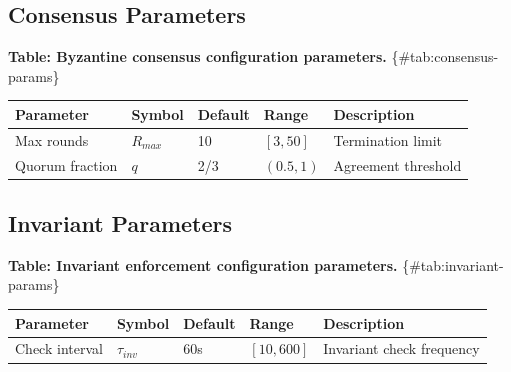 \documentclass[
]{article}
\newcounter{none} %
\begin{document}
\subsection{Consensus Parameters}\label{sec:consensus-params}

\textbf{Table: Byzantine consensus configuration parameters.}
\{\#tab:consensus-params\}

{\def\LTcaptype{none} %
\begin{longtable}[]{@{}lllll@{}}
\toprule\noalign{}
Parameter & Symbol & Default & Range & Description \\
\midrule\noalign{}
\endhead
\bottomrule\noalign{}
\endlastfoot
Max rounds & \(R_{max}\) & 10 & \([3, 50]\) & Termination limit \\
Quorum fraction & \(q\) & 2/3 & \((0.5, 1)\) & Agreement threshold \\
\end{longtable}
}

\subsection{Invariant Parameters}\label{sec:invariant-params}

\textbf{Table: Invariant enforcement configuration parameters.}
\{\#tab:invariant-params\}

{\def\LTcaptype{none} %
\begin{longtable}[]{@{}
  >{\raggedright\arraybackslash}p{}
  >{\raggedright\arraybackslash}p{}
  >{\raggedright\arraybackslash}p{}
  >{\raggedright\arraybackslash}p{}
  >{\raggedright\arraybackslash}p{}@{}}
\toprule\noalign{}
\begin{minipage}[b]{\linewidth}\raggedright
Parameter
\end{minipage} & \begin{minipage}[b]{\linewidth}\raggedright
Symbol
\end{minipage} & \begin{minipage}[b]{\linewidth}\raggedright
Default
\end{minipage} & \begin{minipage}[b]{\linewidth}\raggedright
Range
\end{minipage} & \begin{minipage}[b]{\linewidth}\raggedright
Description
\end{minipage} \\
\midrule\noalign{}
\endhead
\bottomrule\noalign{}
\endlastfoot
Check interval & \(\tau_{inv}\) & 60s & \([10, 600]\) & Invariant check
frequency \\
\end{longtable}
}
\end{document}
